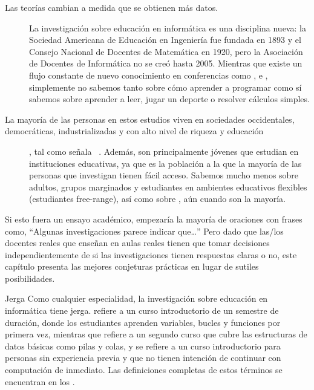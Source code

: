 \begin{description}

\item[Las teorías cambian a medida que se obtienen más datos.]
  La investigación sobre educación en informática es una disciplina nueva:
  la Sociedad Americana de Educación en Ingeniería fue fundada en 1893 y el Consejo Nacional de Docentes de Matemática en 1920, pero la Asociación de Docentes de Informática no se creó hasta 2005.
  Mientras que existe un flujo constante de nuevo conocimiento en conferencias como ,
  e ,
  simplemente no sabemos tanto sobre cómo aprender a programar como sí sabemos sobre aprender a leer, jugar un deporte o resolver cálculos simples.
 
\item[La mayoría de las personas en estos estudios
  viven en sociedades occidentales, democráticas, industrializadas y con alto nivel de riqueza y educación], tal como señala ~\cite{Henr2010}.
  Además,
  son principalmente jóvenes que estudian en instituciones educativas, ya que es la población a la que la mayoría de las personas que investigan tienen fácil acceso.
  Sabemos mucho menos sobre adultos, grupos marginados y estudiantes en ambientes educativos flexibles (estudiantes free-range), así como sobre ,
  aún cuando son la mayoría.

\end{description}

Si esto fuera un ensayo académico, empezaría la mayoría de oraciones con frases como,
``Algunas investigaciones parece indicar que{\ldots}''
Pero dado que las/los docentes reales que enseñan en aulas reales tienen que tomar decisiones independientemente de si las investigaciones tienen respuestas claras o no, este capítulo presenta las mejores conjeturas prácticas en lugar de sutiles posibilidades.

\begin{aside}{Jerga}
  Como cualquier especialidad,
  la investigación sobre educación en informática tiene jerga.
   refiere a un curso introductorio de un semestre de duración, donde los estudiantes aprenden variables, bucles y funciones por primera vez, mientras que  refiere a un segundo curso que cubre las estructuras de datos básicas como pilas y colas, 
  y  se refiere a un curso introductorio para personas sin experiencia previa y que no tienen intención de continuar con computación de inmediato.
  Las definiciones completas de estos términos se encuentran en los .
\end{aside}

